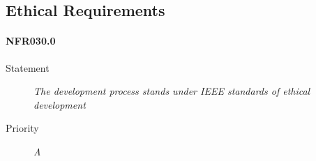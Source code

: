 \subsection{Ethical Requirements}

\paragraph{NFR030.0}
\begin{description}
\item[Statement] \textit{
The development process stands under \gls{IEEE} standards of ethical development
}
\item[Priority] \textit{A}
\end{description}